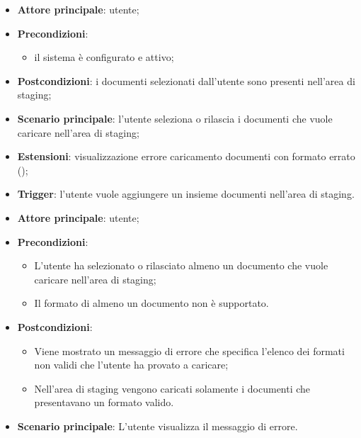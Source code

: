 \documentclass[10pt, a4paper]{article}
\begin{document}
    \begin{itemize}
        \item \textbf{Attore principale}: utente;
        \item \textbf{Precondizioni}:
            \begin{itemize}
                \item il sistema è configurato e attivo;
            \end{itemize}
        \item \textbf{Postcondizioni}: i documenti selezionati dall’utente sono presenti nell’area di staging;
        \item \textbf{Scenario principale}: l’utente seleziona o rilascia i documenti che vuole caricare nell’area di staging;
        \item \textbf{Estensioni}: visualizzazione errore caricamento documenti con formato errato ();
        \item \textbf{Trigger}: l’utente vuole aggiungere un insieme documenti nell’area di staging.
    \end{itemize}

    \begin{itemize}
        \item \textbf{Attore principale}: utente;
        \item \textbf{Precondizioni}:
            \begin{itemize}
                \item L’utente ha selezionato o rilasciato almeno un documento che vuole caricare nell’area di staging;
                \item Il formato di almeno un documento non è supportato.
            \end{itemize}
        \item \textbf{Postcondizioni}:
            \begin{itemize}
                \item Viene mostrato un messaggio di errore che specifica l'elenco dei formati non validi che l'utente ha provato a caricare;
                \item Nell’area di staging vengono caricati solamente i documenti che presentavano un formato valido.
            \end{itemize}
        \item \textbf{Scenario principale}: L’utente visualizza il messaggio di errore.
    \end{itemize}
\end{document}
